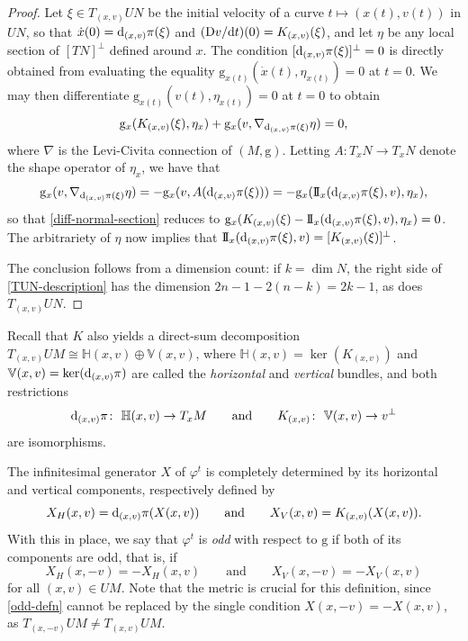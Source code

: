 \documentclass[pdftex]{sigma}
\newcommand{\g}{\mathrm{g}}
\numberwithin{equation}{section}
\theoremstyle{definition}
\begin{document}
\begin{proof}
 Let $\xi\in T_{(x,v)}UN$ be the initial velocity of a curve $t\mapsto (x(t),v(t))$ in $UN$, so that \mbox{$\dot{x}(0) = {\rm d}_{(x,v)}\pi(\xi)$} and $({\rm D}v/{\rm d}t)(0) = K_{(x,v)}(\xi)$, and let $\eta$ be any local section of $[TN]^\perp$ defined around $x$. The condition $[{\rm d}_{(x,v)}\pi(\xi)]^\perp= 0$ is directly obtained from evaluating the equality $\g_{x(t)}(\dot{x}(t), \eta_{x(t)}) = 0$ at $t=0$. We may then differentiate $\g_{x(t)}(v(t), \eta_{x(t)})=0$ at $t=0$ to obtain \begin{equation}\label{diff-normal-section}\g_x(K_{(x,v)}(\xi), \eta_x) + \g_x(v, \nabla_{{\rm d}_{(x,v)}\pi(\xi)}\eta)=0,\end{equation}where $\nabla$ is the Levi-Civita connection of $(M,\g)$. Letting $A\colon T_xN\to T_xN$ denote the shape operator of $\eta_x$, we have that \begin{equation*}
 \g_x(v, \nabla_{{\rm d}_{(x,v)}\pi(\xi)}\eta) = -\g_x(v, A({\rm d}_{(x,v)}\pi(\xi))) = -\g_x( {\rm I\!I}_x({\rm d}_{(x,v)}\pi(\xi) ,v), \eta_x),
 \end{equation*}so that \eqref{diff-normal-section} reduces to $\g_x(K_{(x,v)}(\xi) - {\rm I\!I}_x({\rm d}_{(x,v)}\pi(\xi) ,v),\eta_x ) = 0$. The arbitrariety of $\eta$ now implies that ${\rm I\!I}_x({\rm d}_{(x,v)}\pi(\xi), v) = [K_{(x,v)}(\xi)]^\perp$.

 The conclusion follows from a dimension count: if $k=\dim N$, the right side of \eqref{TUN-description} has the dimension $2n-1-2(n-k) = 2k-1$, as does $T_{(x,v)}UN$. \end{proof}

Recall that $K$ also yields a direct-sum decomposition $T_{(x,v)}UM \cong \mathbb{H}(x,v) \oplus \mathbb{V}(x,v)$, where $\mathbb{H}(x,v) = \ker(K_{(x,v)})$ and $\mathbb{V}(x,v) = \ker({\rm d}_{(x,v)}\pi)$ are called the \emph{horizontal} and \emph{vertical} bundles, and both restrictions
\begin{equation}\label{dpi-K-isomorphisms}
{\rm d}_{(x,v)}\pi \colon \ \mathbb{H}(x,v) \rightarrow T_xM\qquad\mbox{and}\qquad K_{(x,v)} \colon \ \mathbb{V}(x,v) \rightarrow v^\perp
\end{equation}are isomorphisms.

The infinitesimal generator $X$ of $\varphi^t$ is completely determined by its horizontal and vertical components, respectively defined by \begin{equation}\label{hor-ver-comps} X_H(x,v) = {\rm d}_{(x,v)}\pi(X(x,v))\qquad\mbox{and} \qquad X_V(x,v) = K_{(x,v)}(X(x,v)).\end{equation} With this in place, we say that $\varphi^t$ is \emph{odd} with respect to $\g$ if both of its components are odd, that is, if
\begin{equation}\label{odd-defn} X_H(x,-v) = - X_H(x,v) \qquad\text{and}\qquad X_V(x,-v) = -X_V(x,v)\end{equation}for all $(x,v)\in UM$. Note that the metric is crucial for this definition, since \eqref{odd-defn} cannot be replaced by the single condition $X(x,-v) = -X(x,v)$, as $T_{(x,-v)}UM \neq T_{(x,v)}UM$.
\end{document}
